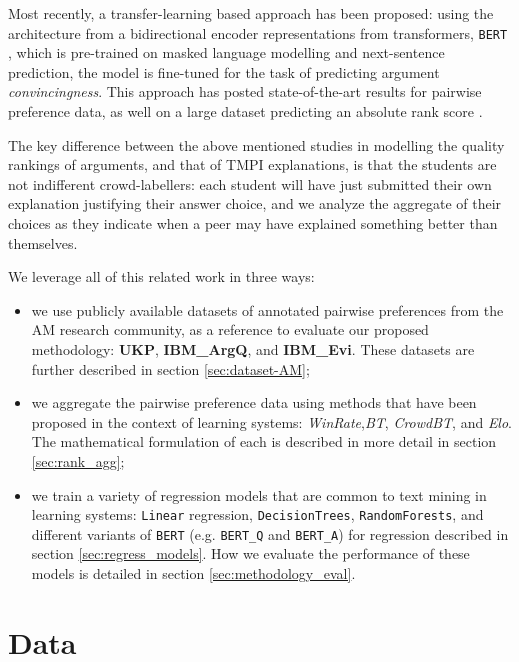 \documentclass[notitlepage,12pt]{jedm}
\begin{document}
Most recently, a transfer-learning based approach has been proposed: using the 
architecture from a bidirectional encoder representations from transformers, 
\verb|BERT| \cite{devlin_bert_2018}, which is pre-trained on masked language 
modelling and next-sentence prediction, the model is fine-tuned for the task of 
predicting argument \textit{convincingness}.
This approach has posted state-of-the-art results for pairwise preference data, 
as well on a large dataset predicting an absolute rank score 
\cite{gretz_large-scale_2019}.

The key difference between the above mentioned studies in modelling the quality 
rankings of arguments, and that of TMPI explanations, is that the students are 
not indifferent crowd-labellers: each student will have just submitted their 
own explanation justifying their answer choice, and we analyze the aggregate of 
their choices as they indicate when a peer may have explained something better 
than themselves.

We leverage all of this related work in three ways:
\begin{itemize}
	\item we use publicly available datasets of annotated pairwise preferences 
	from the AM research community, as a reference to evaluate our proposed 
	methodology: \textbf{UKP}, \textbf{IBM\_ArgQ}, and \textbf{IBM\_Evi}. 
	These datasets are further described in section \ref{sec:dataset-AM};
	\item we aggregate the pairwise preference data using methods that have 
	been proposed in the context of learning systems: 
	\textit{WinRate},\textit{BT}, \textit{CrowdBT}, and \textit{Elo}.
	The mathematical formulation of each is described in more detail in section 
	\ref{sec:rank_agg};
	\item we train a variety of regression models that are common to text 
	mining in learning systems: \verb|Linear| regression, \verb|DecisionTrees|, 
	\verb|RandomForests|, and different variants of \verb|BERT| (e.g. 
	\verb|BERT_Q| and \verb|BERT_A|) for regression described in section 
	\ref{sec:regress_models}. 
	How we evaluate the performance of these models is detailed in section 
	\ref{sec:methodology_eval}.
\end{itemize}


\section{Data}\label{sec:datasets}
\end{document}
